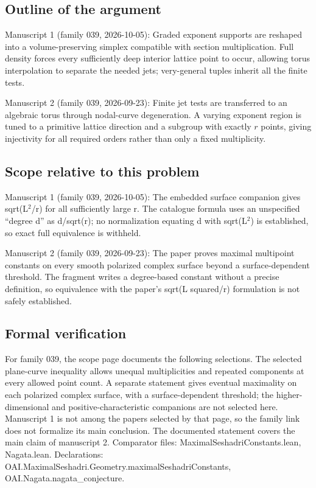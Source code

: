 \documentclass[11pt]{article}
\begin{document}
\subsection{Outline of the argument}
Manuscript 1 (family 039, 2026-10-05): Graded exponent supports are reshaped into a volume-preserving simplex compatible with section multiplication. Full density forces every sufficiently deep interior lattice point to occur, allowing torus interpolation to separate the needed jets; very-general tuples inherit all the finite tests.

Manuscript 2 (family 039, 2026-09-23): Finite jet tests are transferred to an algebraic torus through nodal-curve degeneration. A varying exponent region is tuned to a primitive lattice direction and a subgroup with exactly $r$ points, giving injectivity for all required orders rather than only a fixed multiplicity.

\subsection{Scope relative to this problem}
Manuscript 1 (family 039, 2026-10-05): The embedded surface companion gives sqrt(L\({}^{2}\)/r) for all sufficiently large r. The catalogue formula uses an unspecified “degree d” as d/sqrt(r); no normalization equating d with sqrt(L\({}^{2}\)) is established, so exact full equivalence is withheld.

Manuscript 2 (family 039, 2026-09-23): The paper proves maximal multipoint constants on every smooth polarized complex surface beyond a surface-dependent threshold. The fragment writes a degree-based constant without a precise definition, so equivalence with the paper's sqrt(L squared/r) formulation is not safely established.

\subsection{Formal verification}
For family 039, the scope page documents the following selections. The selected plane-curve inequality allows unequal multiplicities and repeated components at every allowed point count. A separate statement gives eventual maximality on each polarized complex surface, with a surface-dependent threshold; the higher-dimensional and positive-characteristic companions are not selected here. Manuscript 1 is not among the papers selected by that page, so the family link does not formalize its main conclusion. The documented statement covers the main claim of manuscript 2. Comparator files: MaximalSeshadriConstants.lean, Nagata.lean. Declarations: OAI.MaximalSeshadri.Geometry.maximalSeshadriConstants, OAI.Nagata.nagata\_conjecture.
\end{document}
